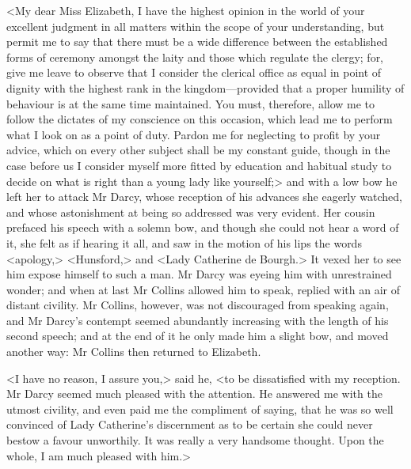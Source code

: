 <My dear Miss Elizabeth, I have the highest opinion in the world of your excellent judgment in all matters within the scope of your understanding, but permit me to say that there must be a wide difference between the established forms of ceremony amongst the laity and those which regulate the clergy; for, give me leave to observe that I consider the clerical office as equal in point of dignity with the highest rank in the kingdom—provided that a proper humility of behaviour is at the same time maintained. You must, therefore, allow me to follow the dictates of my conscience on this occasion, which lead me to perform what I look on as a point of duty. Pardon me for neglecting to profit by your advice, which on every other subject shall be my constant guide, though in the case before us I consider myself more fitted by education and habitual study to decide on what is right than a young lady like yourself;> and with a low bow he left her to attack Mr Darcy, whose reception of his advances she eagerly watched, and whose astonishment at being so addressed was very evident. Her cousin prefaced his speech with a solemn bow, and though she could not hear a word of it, she felt as if hearing it all, and saw in the motion of his lips the words <apology,> <Hunsford,> and <Lady Catherine de Bourgh.> It vexed her to see him expose himself to such a man. Mr Darcy was eyeing him with unrestrained wonder; and when at last Mr Collins allowed him to speak, replied with an air of distant civility. Mr Collins, however, was not discouraged from speaking again, and Mr Darcy's contempt seemed abundantly increasing with the length of his second speech; and at the end of it he only made him a slight bow, and moved another way: Mr Collins then returned to Elizabeth.

<I have no reason, I assure you,> said he, <to be dissatisfied with my reception. Mr Darcy seemed much pleased with the attention. He answered me with the utmost civility, and even paid me the compliment of saying, that he was so well convinced of Lady Catherine's discernment as to be certain she could never bestow a favour unworthily. It was really a very handsome thought. Upon the whole, I am much pleased with him.>

